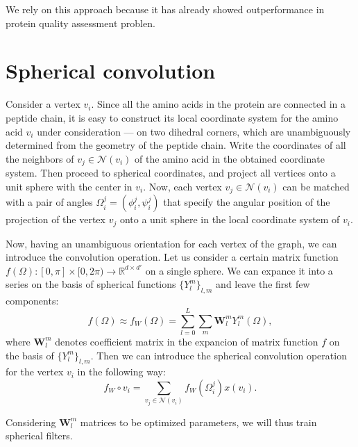 \documentclass[12pt,twoside]{article}
\begin{document}
	We rely on this approach because it has already showed outperformance in protein quality assessment problen\cite{Baldassarre2020GRAPHQAPM}.

	\section{Spherical convolution}
	Consider a vertex $v_i$. Since all the amino acids in the protein are connected in a peptide chain, it is easy to
	construct its local coordinate system for the amino acid $v_i$ under consideration — on two dihedral corners,
	which are unambiguously determined from the geometry of the peptide chain. Write the coordinates of all the neighbors of $v_j \in \mathcal{N}(v_i)$
	of the amino acid in the obtained coordinate system. Then proceed to spherical coordinates, and project all vertices onto a unit sphere
	with the center in $v_i$. Now, each vertex $v_j \in \mathcal{N}(v_i)$ can be matched with a pair of angles $\Omega_i^j = (\phi_i^j, \psi_i^j)$ that specify the
	angular position of the projection of the vertex $v_j$ onto a unit sphere in the local coordinate system of $v_i$.

	Now, having an unambiguous orientation for each vertex of the graph, we can introduce the convolution operation. Let us consider a certain 
	matrix function $f(\Omega) : [0, \pi] \times [0, 2\pi) \rightarrow \mathbb{R}^{d \times d'} $ on a single sphere. We can expance it
	into a series on the basis of spherical functions $\{Y_l^m\}_{l,m}$ and leave the first few components:
	$$
		f(\Omega) \approx f_W(\Omega) = \sum_{l=0}^{L}\sum_m \boldsymbol{W}_l^m Y_l^m(\Omega),
	$$
	where $\boldsymbol{W}_l^m$ denotes coefficient matrix in the expancion of matrix function $f$ on the basis of $\{Y_l^m\}_{l,m}$. Then
	we can introduce the spherical convolution operation for the vertex $v_i$ in the following way:
	$$f_W \circ v_i = \sum_{v_j \in \mathcal{N}(v_i)} f_W(\Omega_i^j)x(v_i).$$

	Considering $\boldsymbol{W}_l^m$ matrices to be optimized parameters, we will thus train spherical filters.
\end{document}
